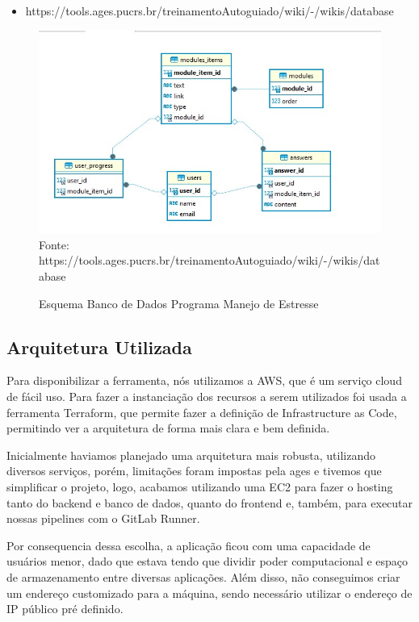     \begin{itemize}
      \item https://tools.ages.pucrs.br/treinamentoAutoguiado/wiki/-/wikis/database
    \end{itemize}

    \begin{figure}[H]
        \centering
        \small
        \caption{Esquema Banco de Dados Programa Manejo de Estresse}
        \includegraphics[width=1\linewidth]{conteudo//4 - ages III//conteudo//figures//bd.jpg}
        Fonte: https://tools.ages.pucrs.br/treinamentoAutoguiado/wiki/-/wikis/database
    \end{figure}

\subsection{Arquitetura Utilizada}
  Para disponibilizar a ferramenta, nós utilizamos a AWS\cite{aws}, que é um serviço cloud de fácil uso. Para fazer a instanciação dos recursos a serem utilizados foi usada a ferramenta Terraform, que permite fazer a definição de Infrastructure as Code, permitindo ver a arquitetura de forma mais clara e bem definida.

Inicialmente haviamos planejado uma arquitetura mais robusta, utilizando diversos serviços, porém, limitações foram impostas pela \ac{ages} e tivemos que simplificar o projeto, logo, acabamos utilizando uma EC2 para fazer o hosting tanto do backend e banco de dados, quanto do frontend e, também, para executar nossas pipelines com o GitLab Runner.

Por consequencia dessa escolha, a aplicação ficou com uma capacidade de usuários menor, dado que estava tendo que dividir poder computacional e espaço de armazenamento entre diversas aplicações. Além disso, não conseguimos criar um endereço customizado para a máquina, sendo necessário utilizar o endereço de IP público pré definido.

